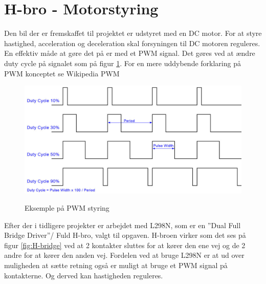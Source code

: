
\section{H-bro - Motorstyring}

Den bil der er fremskaffet til projektet er udstyret med en DC motor. For at styre hastighed, acceleration og deceleration skal forsyningen til DC motoren reguleres. En effektiv måde at gøre det på er med et PWM signal. Det gøres ved at ændre duty cycle på signalet som på figur \ref{fig:PWMpic}. For en mere uddybende forklaring på PWM konceptet se Wikipedia PWM \cite{lib:wikiPWM}

\begin{figure}[h]
	\centering
	\includegraphics[width=\textwidth* 6/10]{../fig/billeder/pwm_lrg}
	\label{fig:PWMpic}
	\caption{Eksemple på PWM styring}
\end{figure}

Efter der i tidligere projekter er arbejdet med L298N\cite{lib:L298N_datablad}, som er en ''Dual Full Bridge Driver''/ Fuld H-bro, valgt til opgaven. H-broen virker som det ses på figur \ref{fig:H-bridge} ved at 2 kontakter sluttes for at kører den ene vej og de 2 andre for at kører den anden vej. Fordelen ved at bruge L298N er at ud over muligheden at sætte retning også er muligt at bruge et PWM signal på kontakterne. Og derved kan hastigheden reguleres.


